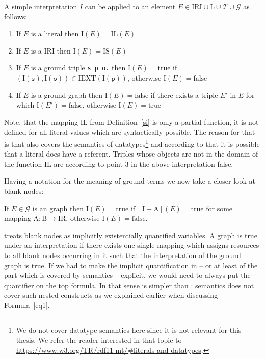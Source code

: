 \begin{definition}
A simple interpretation $I$ can be applied to an element $E\in \mathrm{IRI}\cup\mathrm{L}\cup\mathcal{T}\cup\mathcal{G}$ as follows: 
\begin{enumerate}
 \item If $E$ is a literal then $\mathrm{I}(E)=\mathrm{IL}(E)$
 \item If $E$ is a IRI then $\mathrm{I}(E)=\mathrm{IS}(E)$
 \item If $E$ is a ground triple \texttt{s p o.} then $ \mathrm{I}(E)=\text{true}$ if $(\mathrm{I}(\texttt{s}), \mathrm{I}(\texttt{o}))\in \mathrm{IEXT}(\mathrm{I}(\texttt{p}))$, otherwise 
 $\mathrm{I}(E)=\text{false}$
 \item If $E$ is a ground graph then $\mathrm{I}(E)=\text{false}$ if there exists a triple $E'$ in $E$ for which $\mathrm{I}(E')=\text{false}$, otherwise $\mathrm{I}(E)=\text{true}$ 
 \end{enumerate}
\end{definition}
Note, that the mapping $\mathrm{IL}$ from Definition~\ref{si} is only a partial function, \ie it is not defined for all literal values which are syntactically possible. 
The reason for that is that \rdf also covers the semantics of datatypes\footnote{We do not cover datatype semantics here since it is not relevant for this thesis. We refer the reader interested in that topic 
to \url{https://www.w3.org/TR/rdf11-mt/\#literals-and-datatypes}.} and according to that it is possible that a literal does have a referent. 
Triples whose objects are not in the domain of the function $\mathrm{IL}$ are according to point 3 in the above interpretation false.

Having a notation for the meaning of ground terms we now take a closer look at blank nodes: %
\begin{definition}\label{rdfbl}
 If $E\in \mathcal{G}$ is an \rdf graph then  $\mathrm{I}(E)=\text{true}$ if $[\mathrm{I}+\mathrm{A}](E)=\text{true}$ for some mapping $\mathrm{A}: \mathrm{B} \rightarrow \mathrm{IR}$, 
 otherwise $\mathrm{I}(E)=\text{false}$.
\end{definition}
\rdf treats blank nodes as implicitly existentially quantified variables. 
A graph is true under an interpretation if there exists one single mapping which assigns resources to all blank nodes occurring in it such that the interpretation of 
the ground graph is true. If we had to make the implicit quantification in \rdf{} -- or at least of the part which is covered by \rdf semantics -- explicit, we would need to 
always put the quantifier on the top formula. In that sense \rdf is simpler than \nthree: \rdf semantics does not cover such nested constructs as we explained earlier when 
discussing Formula~\ref{eq1}.

